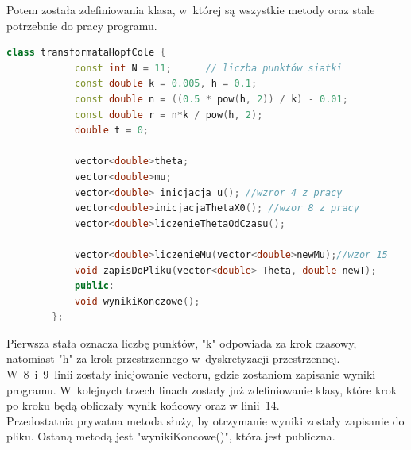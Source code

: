 \documentclass[a4paper,12pt]{article}
\begin{document}
	Potem została zdefiniowania klasa, w~której są wszystkie metody oraz stale potrzebnie do pracy programu.
	\begin{lstlisting}[caption={klasa tranformataHopfCofe},label={klasa}, language=C++]
		class transformataHopfCole {
			const int N = 11;      // liczba punktów siatki
			const double k = 0.005, h = 0.1;
			const double n = ((0.5 * pow(h, 2)) / k) - 0.01;
			const double r = n*k / pow(h, 2);
			double t = 0;
			
			vector<double>theta;
			vector<double>mu;
			vector<double> inicjacja_u(); //wzror 4 z pracy
			vector<double>inicjacjaThetaX0(); //wzor 8 z pracy
			vector<double>liczenieThetaOdCzasu();
			
			vector<double>liczenieMu(vector<double>newMu);//wzor 15
			void zapisDoPliku(vector<double> Theta, double newT);
			public:
			void wynikiKonczowe();
		};\end{lstlisting}
	Pierwsza stała oznacza liczbę punktów, "k" odpowiada za krok czasowy, natomiast "h" za krok przestrzennego w~dyskretyzacji przestrzennej.\\
	W~8~i~9~linii zostały inicjowanie vectoru, gdzie zostaniom zapisanie wyniki programu. W~kolejnych trzech linach zostały już zdefiniowanie klasy, które krok po kroku będą obliczały wynik końcowy oraz w linii~14.\\
	Przedostatnia prywatna metoda służy, by otrzymanie wyniki zostały zapisanie do pliku. Ostaną metodą jest "wynikiKoncowe()", która jest publiczna. 
\end{document}
